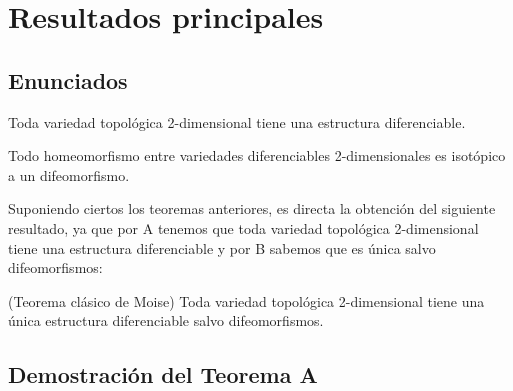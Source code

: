 
\chapter{Resultados principales}

\section{Enunciados}
	\begin{teora}
		Toda variedad topológica 2-dimensional tiene una estructura diferenciable.
	\end{teora}

	\begin{teorb}
		Todo homeomorfismo entre variedades diferenciables 2-dimensionales es isotópico a un difeomorfismo.
	\end{teorb}
	
	Suponiendo ciertos los teoremas anteriores, es directa la obtención del siguiente resultado, ya que por A tenemos que toda variedad topológica 2-dimensional tiene una estructura diferenciable y por B sabemos que es única salvo difeomorfismos:
	
	\begin{corolario} (Teorema clásico de Moise)
		Toda variedad topológica 2-dimensional tiene una única estructura diferenciable salvo difeomorfismos.
	\end{corolario}

\section{Demostración del Teorema A}

